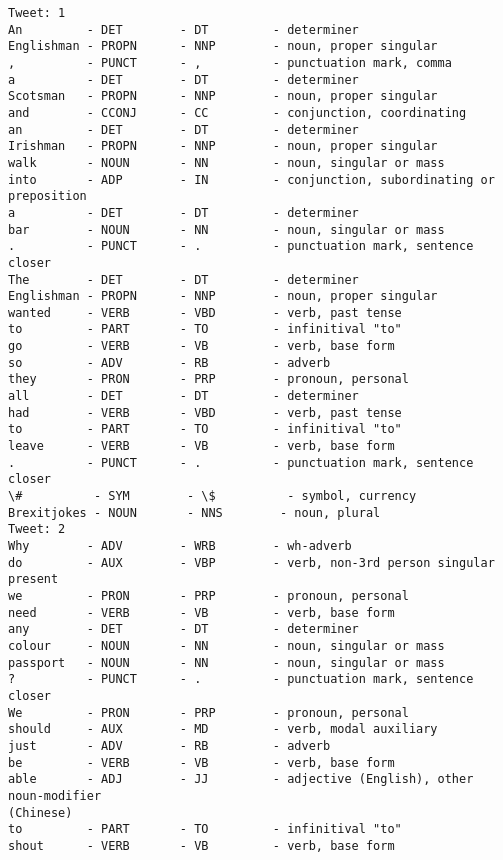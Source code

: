 \documentclass[11pt]{article}
\begin{document}
    \begin{Verbatim}[commandchars=\\\{\}]
Tweet: 1
An         - DET        - DT         - determiner
Englishman - PROPN      - NNP        - noun, proper singular
,          - PUNCT      - ,          - punctuation mark, comma
a          - DET        - DT         - determiner
Scotsman   - PROPN      - NNP        - noun, proper singular
and        - CCONJ      - CC         - conjunction, coordinating
an         - DET        - DT         - determiner
Irishman   - PROPN      - NNP        - noun, proper singular
walk       - NOUN       - NN         - noun, singular or mass
into       - ADP        - IN         - conjunction, subordinating or preposition
a          - DET        - DT         - determiner
bar        - NOUN       - NN         - noun, singular or mass
.          - PUNCT      - .          - punctuation mark, sentence closer
The        - DET        - DT         - determiner
Englishman - PROPN      - NNP        - noun, proper singular
wanted     - VERB       - VBD        - verb, past tense
to         - PART       - TO         - infinitival "to"
go         - VERB       - VB         - verb, base form
so         - ADV        - RB         - adverb
they       - PRON       - PRP        - pronoun, personal
all        - DET        - DT         - determiner
had        - VERB       - VBD        - verb, past tense
to         - PART       - TO         - infinitival "to"
leave      - VERB       - VB         - verb, base form
.          - PUNCT      - .          - punctuation mark, sentence closer
\#          - SYM        - \$          - symbol, currency
Brexitjokes - NOUN       - NNS        - noun, plural
Tweet: 2
Why        - ADV        - WRB        - wh-adverb
do         - AUX        - VBP        - verb, non-3rd person singular present
we         - PRON       - PRP        - pronoun, personal
need       - VERB       - VB         - verb, base form
any        - DET        - DT         - determiner
colour     - NOUN       - NN         - noun, singular or mass
passport   - NOUN       - NN         - noun, singular or mass
?          - PUNCT      - .          - punctuation mark, sentence closer
We         - PRON       - PRP        - pronoun, personal
should     - AUX        - MD         - verb, modal auxiliary
just       - ADV        - RB         - adverb
be         - VERB       - VB         - verb, base form
able       - ADJ        - JJ         - adjective (English), other noun-modifier
(Chinese)
to         - PART       - TO         - infinitival "to"
shout      - VERB       - VB         - verb, base form

\end{Verbatim}
\end{document}
